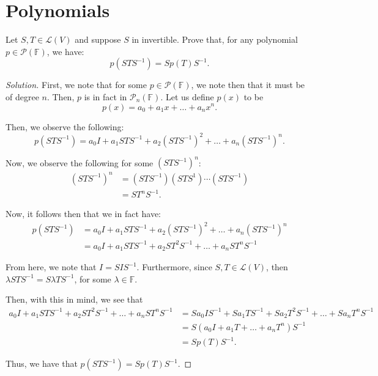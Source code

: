 \documentclass{article}
\newenvironment{solution}{\begin{proof}[Solution]}{\end{proof}}
\begin{document}
	\newpage
	
	\section{Polynomials}
	\begin{hw}
		Let $S,T \in \mathcal L(V)$ and suppose $S$ in invertible. Prove that, for any polynomial $p \in \mathscr P(\mathbb{F})$, we have:
		\begin{equation*}
			p(STS^{-1}) = Sp(T)S^{-1}.
		\end{equation*}
	\end{hw}
	\begin{solution}
		First, we note that for some $p \in \mathscr{P}(\mathbb{F})$, we note then that it must be of degree $n$. Then, $p$ is in fact in $\mathscr{P}_{n}(\mathbb{F})$. Let us define $p(x)$ to be
		\begin{equation*}
			p(x) = a_{0} + a_{1}x + \ldots + a_{n}x^{n}.
		\end{equation*}
	
		Then, we observe the following:
		\begin{equation*}
			p(STS^{-1}) = a_{0}I + a_{1}STS^{-1} + a_{2}(STS^{-1})^{2} + \ldots + a_{n} (STS^{-1})^{n}.
		\end{equation*}
	
		Now, we observe the following for some $(STS^{-1})^{n}$:
		\begin{align*}
			(STS^{-1})^{n} &= (STS^{-1})(STS^{1})\cdots(STS^{-1}) \tag{n times}\\
			&= ST^{n}S^{-1}.
		\end{align*}
	
		Now, it follows then that we in fact have:
		\begin{align*}
			p(STS^{-1}) &= a_{0}I + a_{1}STS^{-1} + a_{2}(STS^{-1})^{2} + \ldots + a_{n} (STS^{-1})^{n} \\
			&= a_{0}I + a_{1} STS^{-1} + a_{2} ST^{2}S^{-1} + \ldots + a_{n}ST^{n}S^{-1}
		\end{align*}
	
		From here, we note that $I = SIS^{-1}$. Furthermore, since $S, T \in \mathcal L (V)$, then $\lambda STS^{-1} = S\lambda TS^{-1}$, for some $\lambda \in \mathbb{F}$.
		
		Then, with this in mind, we see that
		\begin{align*}
			a_{0}I + a_{1} STS^{-1} + a_{2} ST^{2}S^{-1} + \ldots + a_{n}ST^{n}S^{-1} &= Sa_{0}IS^{-1} + Sa_{1}TS^{-1} + Sa_{2}T^{2}S^{-1} + \ldots + Sa_{n}T^{n}S^{-1} \\
			&= S(a_{0}I + a_{1}T + \ldots + a_{n}T^{n})S^{-1} \\
			&= Sp(T)S^{-1}.
		\end{align*}
	
		Thus, we have that $p(STS^{-1}) = Sp(T)S^{-1}$.
	\end{solution}
\end{document}

